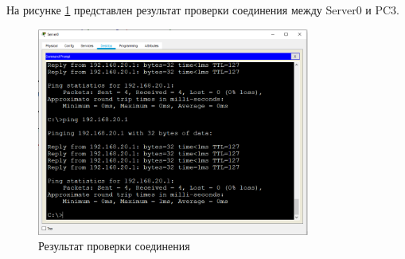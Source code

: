 На рисунке \ref{fig:ping} представлен результат проверки соединения между Server0 и PC3.

\begin{figure}[H]
    \centering
    \includegraphics[width=0.8\textwidth]{img/content/pingPC3.png}
    \caption{Результат проверки соединения}
    \label{fig:ping}
\end{figure}
